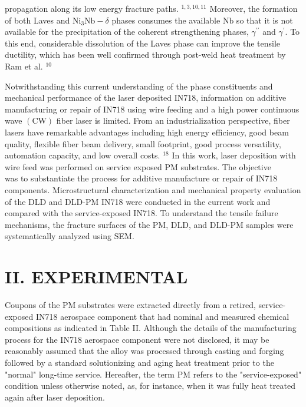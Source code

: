 \documentclass[10pt]{article}
\begin{document}
propagation along its low energy fracture paths. ${ }^{1,3,10,11}$ Moreover, the formation of both Laves and $\mathrm{Ni}_{3} \mathrm{Nb}-\delta$ phases consumes the available $\mathrm{Nb}$ so that it is not available for the precipitation of the coherent strengthening phases, $\gamma^{\prime \prime}$ and $\gamma^{\prime}$. To this end, considerable dissolution of the Laves phase can improve the tensile ductility, which has been well confirmed through post-weld heat treatment by Ram et al. ${ }^{10}$

Notwithstanding this current understanding of the phase constituents and mechanical performance of the laser deposited IN718, information on additive manufacturing or repair of IN718 using wire feeding and a high power continuous wave $(\mathrm{CW})$ fiber laser is limited. From an industrialization perspective, fiber lasers have remarkable advantages including high energy efficiency, good beam quality, flexible fiber beam delivery, small footprint, good process versatility, automation capacity, and low overall costs. ${ }^{18}$ In this work, laser deposition with wire feed was performed on service exposed PM substrates. The objective\\
was to substantiate the process for additive manufacture or repair of IN718 components. Microstructural characterization and mechanical property evaluation of the DLD and DLD-PM IN718 were conducted in the current work and compared with the service-exposed IN718. To understand the tensile failure mechanisms, the fracture surfaces of the PM, DLD, and DLD-PM samples were systematically analyzed using SEM.

\section*{II. EXPERIMENTAL}
Coupons of the PM substrates were extracted directly from a retired, service-exposed IN718 aerospace component that had nominal and measured chemical compositions as indicated in Table II. Although the details of the manufacturing process for the IN718 aerospace component were not disclosed, it may be reasonably assumed that the alloy was processed through casting and forging followed by a standard solutionizing and aging heat treatment prior to the "normal" long-time service. Hereafter, the term PM refers to the "service-exposed" condition unless otherwise noted, as, for instance, when it was fully heat treated again after laser deposition.
\end{document}
